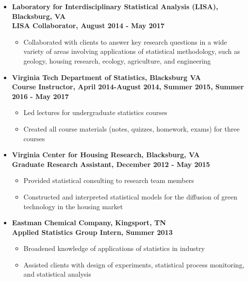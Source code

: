 \documentclass[10pt]{article}
\begin{document}
\begin{itemize}
\item[] \textbf{Laboratory for Interdisciplinary Statistical Analysis (LISA), Blacksburg, VA\\
LISA Collaborator, August 2014 - May 2017}
\begin{itemize}
\item Collaborated with clients to answer key research questions in a wide variety of areas involving applications of statistical methodology, such as geology, housing research, ecology, agriculture, and engineering
\end{itemize}


\item[] \textbf{Virginia Tech Department of Statistics, Blacksburg VA\\
Course Instructor, April 2014-August 2014, Summer 2015, Summer 2016 - May 2017}
\begin{itemize}
\item Led lectures for undergraduate statistics courses
\item Created all course materials (notes, quizzes, homework, exams) for three courses
\end{itemize} 
 
 
\item[] \textbf{Virginia Center for Housing Research, Blacksburg, VA\\
Graduate Research Assistant, December 2012 - May 2015}
\begin{itemize} 
\item Provided statistical consulting to research team members
\item Constructed and interpreted statistical models for the diffusion of green technology in the housing market
\end{itemize} 

\item[] \textbf{Eastman Chemical Company, Kingsport, TN\\
Applied Statistics Group Intern, Summer 2013}
\begin{itemize}
\item Broadened knowledge of applications of statistics in industry
\item Assisted clients with design of experiments, statistical process monitoring, and statistical analysis
\end{itemize} 



\end{itemize}
\end{document}
